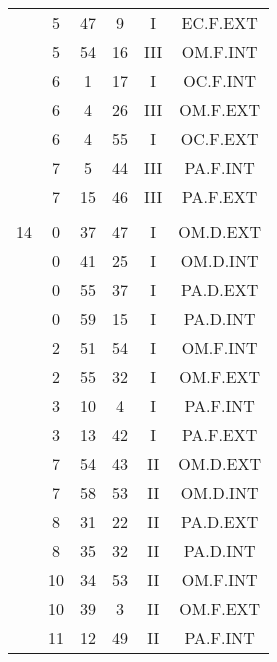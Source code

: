 \documentclass[12pt, a4paper]{article}
\begin{document}
\begin{multicols}{3}
{\begin{tabular}{c c c c c c}
	 	 	 	 & 5 & 47 & 9 & I & EC.F.EXT\\%
	 	 	 	 & 5 & 54 & 16 & III & OM.F.INT\\%
	 	 	 	 & 6 & 1 & 17 & I & OC.F.INT\\%
	 	 	 	 & 6 & 4 & 26 & III & OM.F.EXT\\%
	 	 	 	 & 6 & 4 & 55 & I & OC.F.EXT\\%
	 	 	 	 & 7 & 5 & 44 & III & PA.F.INT\\%
	 	 	 	 & 7 & 15 & 46 & III & PA.F.EXT\\%
	 	 	 	 & & & & & \\%
	 	 	 	14 & 0 & 37 & 47 & I & OM.D.EXT\\%
	 	 	 	 & 0 & 41 & 25 & I & OM.D.INT\\%
	 	 	 	 & 0 & 55 & 37 & I & PA.D.EXT\\%
	 	 	 	 & 0 & 59 & 15 & I & PA.D.INT\\%
	 	 	 	 & 2 & 51 & 54 & I & OM.F.INT\\%
	 	 	 	 & 2 & 55 & 32 & I & OM.F.EXT\\%
	 	 	 	 & 3 & 10 & 4 & I & PA.F.INT\\%
	 	 	 	 & 3 & 13 & 42 & I & PA.F.EXT\\%
	 	 	 	 & 7 & 54 & 43 & II & OM.D.EXT\\%
	 	 	 	 & 7 & 58 & 53 & II & OM.D.INT\\%
	 	 	 	 & 8 & 31 & 22 & II & PA.D.EXT\\%
	 	 	 	 & 8 & 35 & 32 & II & PA.D.INT\\%
	 	 	 	 & 10 & 34 & 53 & II & OM.F.INT\\%
	 	 	 	 & 10 & 39 & 3 & II & OM.F.EXT\\%
	 	 	 	 & 11 & 12 & 49 & II & PA.F.INT\\%

\end{tabular}}
\end{multicols}
\end{document}
